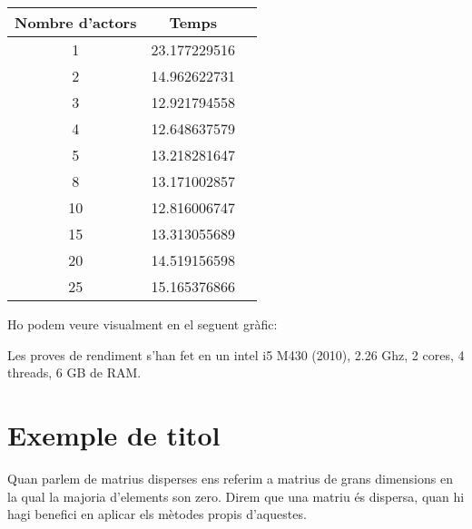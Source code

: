 \documentclass[11pt,a4paper,twoside]{report}
\begin{document}
\begin{center}
\begin{tabular}{| c | c | c |}
\hline
Nombre d'actors  & Temps \\ \hline
1  & 23.177229516 \\ \hline
2  & 14.962622731 \\ \hline
3  & 12.921794558 \\ \hline
4  & 12.648637579 \\ \hline
5  & 13.218281647 \\ \hline
8  & 13.171002857 \\ \hline
10 & 12.816006747 \\ \hline
15 & 13.313055689 \\ \hline
20 & 14.519156598 \\ \hline
25 & 15.165376866 \\
\hline
\end{tabular}
\end{center}

Ho podem veure visualment en el seguent gràfic:

\begin{center}
\end{center}


Les proves de rendiment s'han fet en un intel i5 M430 (2010), 2.26 Ghz, 2 cores, 4 threads, 6 GB de RAM.


\chapter{Exemple de titol}

Quan parlem de matrius disperses ens referim a matrius de grans dimensions en la qual la majoria d'elements son zero. Direm que una matriu és dispersa, quan hi hagi benefici en aplicar els mètodes propis d'aquestes. 
\end{document}
